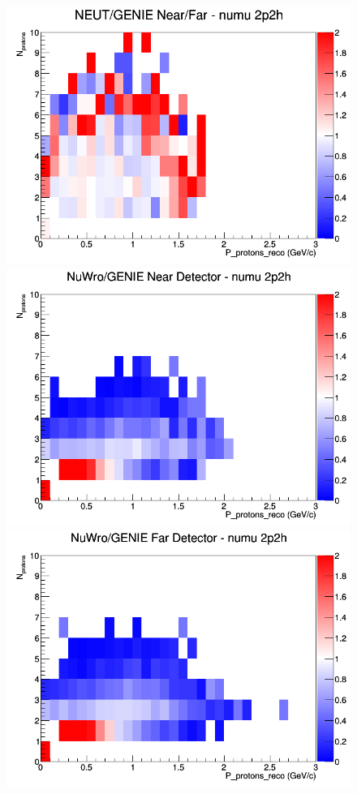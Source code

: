 \begin{figure}[h]
\endminipage
{}
\includegraphics[width=\linewidth]{eff_N_P/LAr/protons/ratios/2p2h_NEUT_GENIE_numu_NF_N_P.png}
\endminipage
\newline
{}
\includegraphics[width=\linewidth]{eff_N_P/LAr/protons/ratios/2p2h_NuWro_GENIE_numu_near_N_P.png}
\endminipage
{}
\includegraphics[width=\linewidth]{eff_N_P/LAr/protons/ratios/2p2h_NuWro_GENIE_numu_far_N_P.png}

\end{figure}
